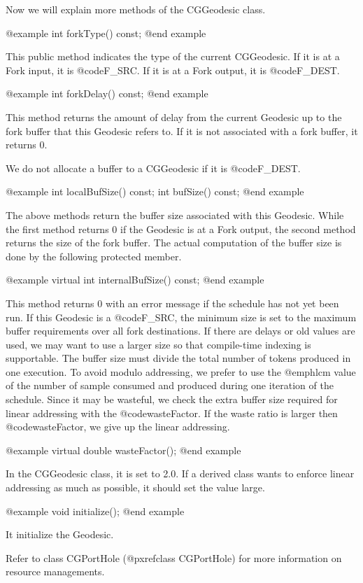 Now we will explain more methods of the CGGeodesic class.

@example
int forkType() const;
@end example

This public method indicates the type of the current CGGeodesic. If it
is at a Fork input, it is @code{F_SRC}. If it is at a Fork output, it is
@code{F_DEST}.

@example
int forkDelay() const;
@end example

This method returns the amount of delay from the current Geodesic up to
the fork buffer that this Geodesic refers to. If it is not associated
with a fork buffer, it returns 0.

We do not allocate a buffer to a CGGeodesic if it is @code{F_DEST}.

@example
int localBufSize() const;
int bufSize() const;
@end example

The above methods return the buffer size associated with this Geodesic.
While the first method returns 0 if the Geodesic is at a Fork output, the
second method returns the size of the fork buffer. The actual computation of
the buffer size is done by the following protected member.

@example
virtual int internalBufSize() const;
@end example

This method returns 0 with an error message if the schedule has not
yet been run. If this Geodesic is a @code{F_SRC}, the minimum size
is set to the maximum buffer requirements over all fork destinations.
If there are delays or old values are used, we may want to use a
larger size so that compile-time indexing is supportable. The buffer size
must divide the total number of tokens produced in one execution.
To avoid modulo addressing, we prefer to use the @emph{lcm} value of
the number of sample consumed and produced during one iteration of the
schedule. Since it may be wasteful, we check the extra buffer size required
for linear addressing with the @code{wasteFactor}. If the waste ratio is
larger then @code{wasteFactor}, we give up the linear addressing.

@example
virtual double wasteFactor();
@end example

In the CGGeodesic class, it is set to 2.0. If a derived class wants to
enforce linear addressing as much as possible, it should set the value
large.

@example
void initialize();
@end example

It initialize the Geodesic.

Refer to class CGPortHole (@pxref{class CGPortHole}) for more information
on resource managements.

